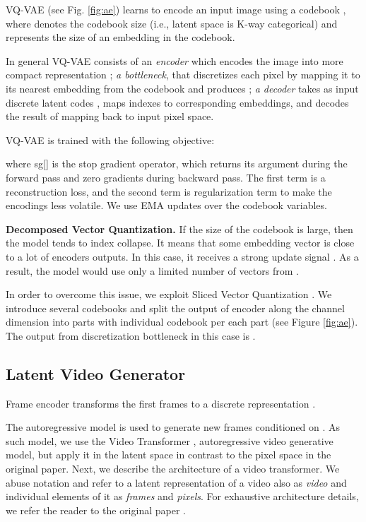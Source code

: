 \documentclass{article}
\begin{document}
VQ-VAE (see Fig. \ref{fig:ae}) learns to encode an input image  using a codebook , where  denotes the codebook size (i.e., latent space is K-way categorical) and  represents the size of an embedding in the codebook.

In general VQ-VAE consists of an \textit{encoder} which encodes the image into more compact representation ;  \textit{a bottleneck}, that discretizes each pixel by mapping it to its nearest embedding  from the codebook and produces ; \textit{a decoder}  takes as input discrete latent codes , maps indexes to corresponding embeddings, and decodes the result of mapping  back to input pixel space.

VQ-VAE is trained with the following objective:



where sg[] is the stop gradient operator, which returns its argument during the forward pass and zero gradients during backward pass. The first term is a reconstruction loss, and the second term is regularization term to make the encodings less volatile. We use EMA updates over the codebook variables.


\textbf{Decomposed Vector Quantization.} If the size  of the codebook  is large, then the model tends to index collapse. It means that some embedding vector  is close to a lot of encoders outputs. In this case, it receives a strong update signal \cite{lt}. As a result, the model would use only a limited number of vectors from .

In order to overcome this issue, we exploit Sliced Vector Quantization \cite{lt}. We introduce several codebooks  and split the output of encoder  along the channel dimension into  parts with individual codebook per each part (see Figure \ref{fig:ae}). The output from discretization bottleneck in this case is .

 \subsection{Latent Video Generator}

Frame encoder transforms the first  frames to a discrete representation .

The autoregressive model is used to generate new  frames conditioned on . As such model, we use the Video Transformer \cite{vt}, autoregressive video generative model, but apply it in the latent space in contrast to the pixel space in the original paper. Next, we describe the architecture of a video transformer. We abuse notation and refer to a latent representation of a video also as \textit{video} and individual elements of it as \textit{frames} and \textit{pixels}. For exhaustive architecture details, we refer the reader to the original paper \cite{vt}.
\end{document}
